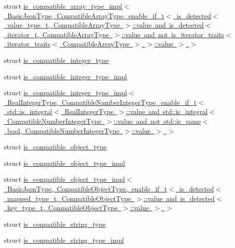 \begin{DoxyCompactItemize}
struct \mbox{\hyperlink{structnlohmann_1_1detail_1_1is__compatible__array__type__impl_3_01_basic_json_type_00_01_compati04c4671a9fa75002365be1949a74f972}{is\+\_\+compatible\+\_\+array\+\_\+type\+\_\+impl$<$ Basic\+Json\+Type, Compatible\+Array\+Type, enable\+\_\+if\+\_\+t$<$ is\+\_\+detected$<$ value\+\_\+type\+\_\+t, Compatible\+Array\+Type $>$\+::value and is\+\_\+detected$<$ iterator\+\_\+t, Compatible\+Array\+Type $>$\+::value and not is\+\_\+iterator\+\_\+traits$<$ iterator\+\_\+traits$<$ Compatible\+Array\+Type $>$ $>$\+::value $>$ $>$}}
\item 
struct \mbox{\hyperlink{structnlohmann_1_1detail_1_1is__compatible__integer__type}{is\+\_\+compatible\+\_\+integer\+\_\+type}}
\item 
struct \mbox{\hyperlink{structnlohmann_1_1detail_1_1is__compatible__integer__type__impl}{is\+\_\+compatible\+\_\+integer\+\_\+type\+\_\+impl}}
\item 
struct \mbox{\hyperlink{structnlohmann_1_1detail_1_1is__compatible__integer__type__impl_3_01_real_integer_type_00_01_com5aa74bcf254245a639da00509f4d2655}{is\+\_\+compatible\+\_\+integer\+\_\+type\+\_\+impl$<$ Real\+Integer\+Type, Compatible\+Number\+Integer\+Type, enable\+\_\+if\+\_\+t$<$ std\+::is\+\_\+integral$<$ Real\+Integer\+Type $>$\+::value and std\+::is\+\_\+integral$<$ Compatible\+Number\+Integer\+Type $>$\+::value and not std\+::is\+\_\+same$<$ bool, Compatible\+Number\+Integer\+Type $>$\+::value $>$ $>$}}
\item 
struct \mbox{\hyperlink{structnlohmann_1_1detail_1_1is__compatible__object__type}{is\+\_\+compatible\+\_\+object\+\_\+type}}
\item 
struct \mbox{\hyperlink{structnlohmann_1_1detail_1_1is__compatible__object__type__impl}{is\+\_\+compatible\+\_\+object\+\_\+type\+\_\+impl}}
\item 
struct \mbox{\hyperlink{structnlohmann_1_1detail_1_1is__compatible__object__type__impl_3_01_basic_json_type_00_01_compatfbe9a153c4ecce445c98bbdd2d65f605}{is\+\_\+compatible\+\_\+object\+\_\+type\+\_\+impl$<$ Basic\+Json\+Type, Compatible\+Object\+Type, enable\+\_\+if\+\_\+t$<$ is\+\_\+detected$<$ mapped\+\_\+type\+\_\+t, Compatible\+Object\+Type $>$\+::value and is\+\_\+detected$<$ key\+\_\+type\+\_\+t, Compatible\+Object\+Type $>$\+::value $>$ $>$}}
\item 
struct \mbox{\hyperlink{structnlohmann_1_1detail_1_1is__compatible__string__type}{is\+\_\+compatible\+\_\+string\+\_\+type}}
\item 
struct \mbox{\hyperlink{structnlohmann_1_1detail_1_1is__compatible__string__type__impl}{is\+\_\+compatible\+\_\+string\+\_\+type\+\_\+impl}}

\end{DoxyCompactItemize}
